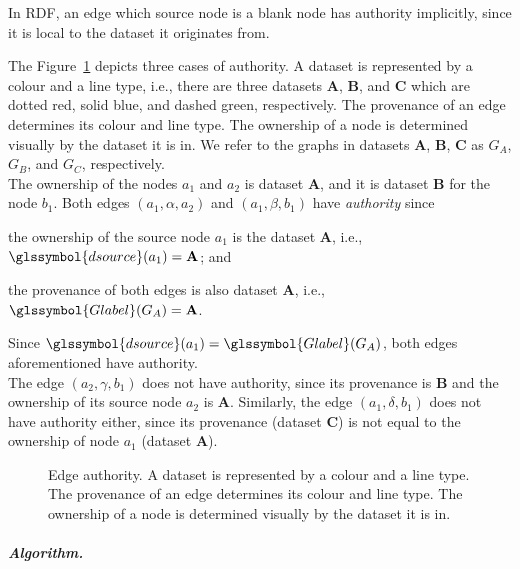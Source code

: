 \begin{remark}
	In RDF, an edge which source node is a blank node has authority implicitly, since it is local to the dataset it originates from.
\end{remark}

The Figure~\ref{chap4:summary:fig:authority} depicts three cases of authority. A dataset is represented by a colour and a line type, i.e., there are three datasets {\bfseries A}, {\bfseries B}, and {\bfseries C} which are dotted red, solid blue, and dashed green, respectively. The provenance of an edge determines its colour and line type. The ownership of a node is determined visually by the dataset it is in. We refer to the graphs in datasets \textbf{A}, \textbf{B}, \textbf{C} as $G_A$, $G_B$, and $G_C$, respectively.\\

The ownership of the nodes $a_1$ and $a_2$ is dataset {\bfseries A}, and it is dataset {\bfseries B} for the node $b_1$. Both edges $(a_1, \alpha, a_2)$ and $\left(a_1, \beta, b_1 \right)$ have \emph{authority} since
\begin{inparaenum}[(1)]
	\item the ownership of the source node $a_1$ is the dataset {\bfseries A}, i.e., $\glssymbol{dsource}(a_1) = \textbf{A}$; and
	\item the provenance of both edges is also dataset {\bfseries A}, i.e., $\glssymbol{Glabel}(G_A) = \textbf{A}$.
\end{inparaenum}
Since $\glssymbol{dsource}(a_1) = \glssymbol{Glabel}(G_A)$, both edges aforementioned have authority.\\

The edge $\left(a_2, \gamma, b_1\right)$ does not have authority, since its provenance is {\bfseries B} and the ownership of its source node $a_2$ is {\bfseries A}. Similarly, the edge $\left(a_1,\delta,b_1\right)$ does not have authority either, since its provenance (dataset \textbf{C}) is not equal to the ownership of node $a_1$ (dataset \textbf{A}).

\begin{figure}
	\centering
	
	\caption[Edge authority]{Edge authority. A dataset is represented by a colour and a line type. The provenance of an edge determines its colour and line type. The ownership of a node is determined visually by the dataset it is in.}
	\label{chap4:summary:fig:authority}
\end{figure}

\subparagraph{Algorithm.}

